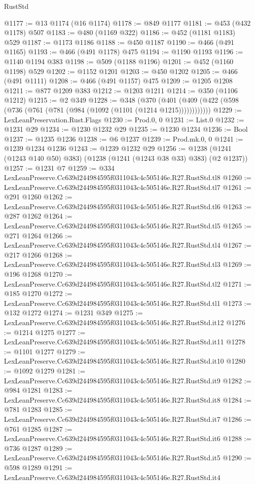 \begin{lexlean}{RustStd}
\begin{coremodule}
@1177 := @13 @1174 (@16 @1174)
@1178 := @849 @1177
@1181 := @453 (@432 @1178) @507
@1183 := @480 (@1169 @322)
@1186 := @452 (@1181 @1183) @529
@1187 := @1173 @1186
@1188 := @450 @1187
@1190 := @466 (@491 @1165)
@1193 := @466 (@491 @1178) @475
@1194 := @1190 @1193
@1196 := @1140 @1194 @383
@1198 := @509 (@1188 @1196)
@1201 := @452 (@1160 @1198) @529
@1202 := @1152 @1201
@1203 := @450 @1202
@1205 := @466 (@491 @1111)
@1208 := @466 (@491 @1157) @475
@1209 := @1205 @1208
@1211 := @877 @1209 @383
@1212 := @1203 @1211
@1214 := @350 (@1106 @1212)
@1215 := @2 @349
@1228 := @348
    (@370 (@401 (@409 (@422 (@598 (@736 (@761 (@781 (@984 (@1092 (@1101 (@1214 @1215))))))))))))
@1229 := LexLeanPreservation.Rust.Flags
@1230 := Prod.{0, 0}
@1231 := List.{0}
@1232 := @1231 @29
@1234 := @1230 @1232 @29
@1235 := @1230 @1234
@1236 := Bool
@1237 := @1235 @1236
@1238 := @6 @1237
@1239 := Prod.mk.{0, 0}
@1241 := @1239 @1234 @1236
@1243 := @1239 @1232 @29
@1256 := @1238 (@1241 (@1243 @140 @50) @383) (@1238 (@1241 (@1243 @38 @33) @383) (@2 @1237))
@1257 := @1231 @7
@1259 := @334 LexLeanPreserve.Cc639d244984595f0311043c4c505146e.R27.RustStd.tl8
@1260 := LexLeanPreserve.Cc639d244984595f0311043c4c505146e.R27.RustStd.tl7
@1261 := @291 @1260
@1262 := LexLeanPreserve.Cc639d244984595f0311043c4c505146e.R27.RustStd.tl6
@1263 := @287 @1262
@1264 := LexLeanPreserve.Cc639d244984595f0311043c4c505146e.R27.RustStd.tl5
@1265 := @271 @1264
@1266 := LexLeanPreserve.Cc639d244984595f0311043c4c505146e.R27.RustStd.tl4
@1267 := @217 @1266
@1268 := LexLeanPreserve.Cc639d244984595f0311043c4c505146e.R27.RustStd.tl3
@1269 := @196 @1268
@1270 := LexLeanPreserve.Cc639d244984595f0311043c4c505146e.R27.RustStd.tl2
@1271 := @185 @1270
@1272 := LexLeanPreserve.Cc639d244984595f0311043c4c505146e.R27.RustStd.tl1
@1273 := @132 @1272
@1274 := @1231 @349
@1275 := LexLeanPreserve.Cc639d244984595f0311043c4c505146e.R27.RustStd.it12
@1276 := @1214 @1275
@1277 := LexLeanPreserve.Cc639d244984595f0311043c4c505146e.R27.RustStd.it11
@1278 := @1101 @1277
@1279 := LexLeanPreserve.Cc639d244984595f0311043c4c505146e.R27.RustStd.it10
@1280 := @1092 @1279
@1281 := LexLeanPreserve.Cc639d244984595f0311043c4c505146e.R27.RustStd.it9
@1282 := @984 @1281
@1283 := LexLeanPreserve.Cc639d244984595f0311043c4c505146e.R27.RustStd.it8
@1284 := @781 @1283
@1285 := LexLeanPreserve.Cc639d244984595f0311043c4c505146e.R27.RustStd.it7
@1286 := @761 @1285
@1287 := LexLeanPreserve.Cc639d244984595f0311043c4c505146e.R27.RustStd.it6
@1288 := @736 @1287
@1289 := LexLeanPreserve.Cc639d244984595f0311043c4c505146e.R27.RustStd.it5
@1290 := @598 @1289
@1291 := LexLeanPreserve.Cc639d244984595f0311043c4c505146e.R27.RustStd.it4

\end{coremodule}
\end{lexlean}

